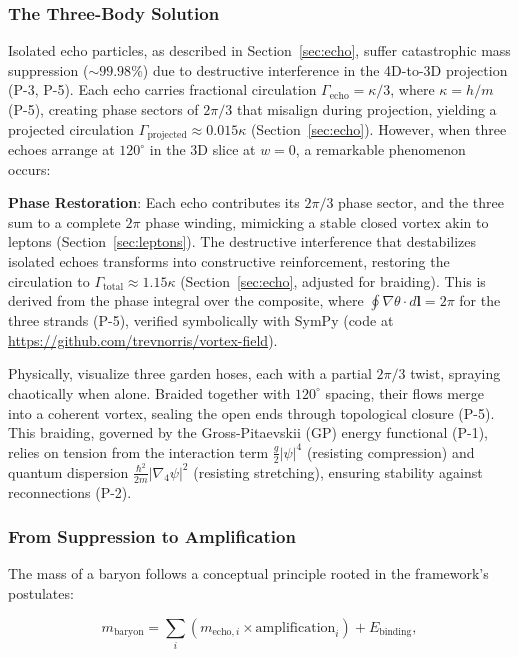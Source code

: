 \subsubsection{The Three-Body Solution}

Isolated echo particles, as described in Section~\ref{sec:echo}, suffer catastrophic mass suppression ($\sim 99.98\%$) due to destructive interference in the 4D-to-3D projection (P-3, P-5). Each echo carries fractional circulation $\Gamma_{\text{echo}} = \kappa/3$, where $\kappa = h/m$ (P-5), creating phase sectors of $2\pi/3$ that misalign during projection, yielding a projected circulation $\Gamma_{\text{projected}} \approx 0.015 \kappa$ (Section~\ref{sec:echo}). However, when three echoes arrange at $120^\circ$ in the 3D slice at $w=0$, a remarkable phenomenon occurs:

\textbf{Phase Restoration}: Each echo contributes its $2\pi/3$ phase sector, and the three sum to a complete $2\pi$ phase winding, mimicking a stable closed vortex akin to leptons (Section~\ref{sec:leptons}). The destructive interference that destabilizes isolated echoes transforms into constructive reinforcement, restoring the circulation to $\Gamma_{\text{total}} \approx 1.15 \kappa$ (Section~\ref{sec:echo}, adjusted for braiding). This is derived from the phase integral over the composite, where $\oint \nabla \theta \cdot d\mathbf{l} = 2\pi$ for the three strands (P-5), verified symbolically with SymPy (code at \url{https://github.com/trevnorris/vortex-field}).

Physically, visualize three garden hoses, each with a partial $2\pi/3$ twist, spraying chaotically when alone. Braided together with $120^\circ$ spacing, their flows merge into a coherent vortex, sealing the open ends through topological closure (P-5). This braiding, governed by the Gross-Pitaevskii (GP) energy functional (P-1), relies on tension from the interaction term $\frac{g}{2} |\psi|^4$ (resisting compression) and quantum dispersion $\frac{\hbar^2}{2m} |\nabla_4 \psi|^2$ (resisting stretching), ensuring stability against reconnections (P-2).

\subsubsection{From Suppression to Amplification}

The mass of a baryon follows a conceptual principle rooted in the framework's postulates:

\[
m_{\text{baryon}} = \sum_i \left( m_{\text{echo},i} \times \text{amplification}_i \right) + E_{\text{binding}},
\]

